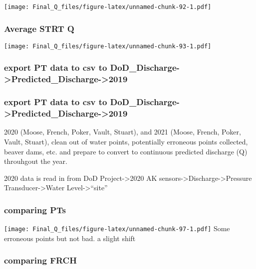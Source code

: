 \documentclass[
]{article}
\begin{document}
\texttt{[image: Final\_Q\_files/figure-latex/unnamed-chunk-92-1.pdf]}

\hypertarget{average-strt-q}{%
\subsubsection{Average STRT Q}\label{average-strt-q}}

\texttt{[image: Final\_Q\_files/figure-latex/unnamed-chunk-93-1.pdf]}

\hypertarget{export-pt-data-to-csv-to-dod_discharge-predicted_discharge-2019-4}{%
\subsubsection{export PT data to csv to
DoD\_Discharge-\textgreater Predicted\_Discharge-\textgreater2019}\label{export-pt-data-to-csv-to-dod_discharge-predicted_discharge-2019-4}}

\hypertarget{export-pt-data-to-csv-to-dod_discharge-predicted_discharge-2019-5}{%
\subsubsection{export PT data to csv to
DoD\_Discharge-\textgreater Predicted\_Discharge-\textgreater2019}\label{export-pt-data-to-csv-to-dod_discharge-predicted_discharge-2019-5}}

2020 (Moose, French, Poker, Vault, Stuart), and 2021 (Moose, French,
Poker, Vault, Stuart), clean out of water points, potentially erroneous
points collected, beaver dams, etc. and prepare to convert to continuous
predicted discharge (Q) throuhgout the year.

2020 data is read in from DoD Project-\textgreater2020 AK
sensors-\textgreater Discharge-\textgreater Pressure
Transducer-\textgreater Water Level-\textgreater{}``site''

\hypertarget{comparing-pts}{%
\subsubsection{comparing PTs}\label{comparing-pts}}

\texttt{[image: Final\_Q\_files/figure-latex/unnamed-chunk-97-1.pdf]} Some
erroneous points but not bad. a slight shift

\hypertarget{comparing-frch}{%
\subsubsection{comparing FRCH}\label{comparing-frch}}
\end{document}
